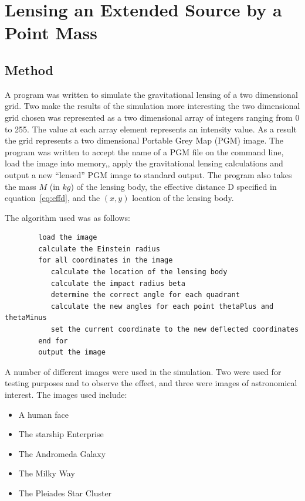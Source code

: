 \documentclass[a4paper]{IEEEtran}
\begin{document}
\section{Lensing an Extended Source by a Point Mass}
    \subsection{Method}
    A program was written to simulate the gravitational lensing 
    of a two dimensional grid. Two make the results of the simulation
    more interesting the two dimensional grid chosen was represented
    as a two dimensional array of integers ranging from 0 to 255.
    The value at each array element represents an intensity value. As a result
    the grid represents a two dimensional Portable Grey Map (PGM) image.
    The program was written to accept the name of a PGM file on the command
    line, load the image into memory,, apply the gravitational lensing calculations
    and output a new ``lensed'' PGM image to standard output. The program
    also takes the mass $M$ (in $kg$) of the lensing body, the effective
    distance D specified in equation~\ref{eq:effd}, and the $(x,y)$
    location of the lensing body.

    The algorithm used was as follows:
    \begin{verbatim}
        load the image
        calculate the Einstein radius
        for all coordinates in the image
           calculate the location of the lensing body 
           calculate the impact radius beta
           determine the correct angle for each quadrant
           calculate the new angles for each point thetaPlus and thetaMinus
           set the current coordinate to the new deflected coordinates
        end for
        output the image
    \end{verbatim}

    A number of different images were used in the simulation. Two were used
    for testing purposes and to observe the effect, and three were images
    of astronomical interest. The images used include:
    \begin{itemize}
        \item A human face
        \item The starship Enterprise
        \item The Andromeda Galaxy
        \item The Milky Way
        \item The Pleiades Star Cluster
    \end{itemize}
\end{document}
